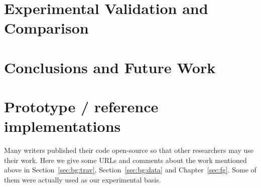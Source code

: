 \documentclass[12pt,a4paper]{report}
\newcommand{\acronym}{\MakeUppercase}
\begin{document}
	
	
	
	
	
	
	\chapter{Experimental Validation and Comparison}
	\label{sec:exp}
	
	\chapter{Conclusions and Future Work}
	\label{sec:concl}
	
	\appendix
	\chapter{Prototype / reference implementations}
	\label{sec:app}
	
	Many writers published their code open-source so that other researchers may 
	use their work. Here we give some \acronym{url}s and comments about the work 
	mentioned above in Section~\ref{sec:bg:trav}, Section~\ref{sec:bg:data} and 
	Chapter~\ref{sec:fg}. Some of them were actually used as our experimental basis.
	\\
	
	\begin{table}[h]
		\centering	
		
	\end{table}
	
	\renewcommand{\bibname}{References}
	
	
\end{document}
